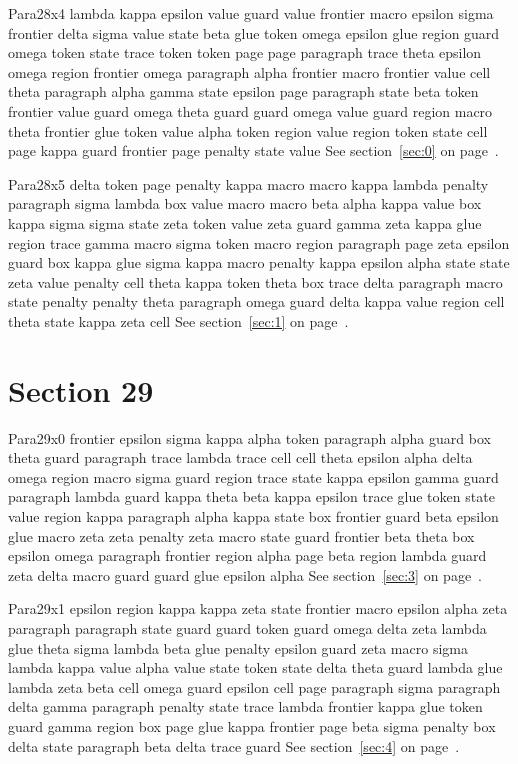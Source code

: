 \documentclass{article}
\begin{document}
Para28x4 lambda kappa epsilon value guard value frontier macro epsilon sigma frontier delta sigma value state beta glue token omega epsilon glue region guard omega token state trace token token page page paragraph trace theta epsilon omega region frontier omega paragraph alpha frontier macro frontier value cell theta paragraph alpha gamma state epsilon page paragraph state beta token frontier value guard omega theta guard guard omega value guard region macro theta frontier glue token value alpha token region value region token state cell page kappa guard frontier page penalty state value See section~\ref{sec:0} on page~\pageref{sec:8}.

Para28x5 delta token page penalty kappa macro macro kappa lambda penalty paragraph sigma lambda box value macro macro beta alpha kappa value box kappa sigma sigma state zeta token value zeta guard gamma zeta kappa glue region trace gamma macro sigma token macro region paragraph page zeta epsilon guard box kappa glue sigma kappa macro penalty kappa epsilon alpha state state zeta value penalty cell theta kappa token theta box trace delta paragraph macro state penalty penalty theta paragraph omega guard delta kappa value region cell theta state kappa zeta cell See section~\ref{sec:1} on page~\pageref{sec:9}.

\section{Section 29}\label{sec:29}
Para29x0 frontier epsilon sigma kappa alpha token paragraph alpha guard box theta guard paragraph trace lambda trace cell cell theta epsilon alpha delta omega region macro sigma guard region trace state kappa epsilon gamma guard paragraph lambda guard kappa theta beta kappa epsilon trace glue token state value region kappa paragraph alpha kappa state box frontier guard beta epsilon glue macro zeta zeta penalty zeta macro state guard frontier beta theta box epsilon omega paragraph frontier region alpha page beta region lambda guard zeta delta macro guard guard glue epsilon alpha See section~\ref{sec:3} on page~\pageref{sec:7}.

Para29x1 epsilon region kappa kappa zeta state frontier macro epsilon alpha zeta paragraph paragraph state guard guard token guard omega delta zeta lambda glue theta sigma lambda beta glue penalty epsilon guard zeta macro sigma lambda kappa value alpha value state token state delta theta guard lambda glue lambda zeta beta cell omega guard epsilon cell page paragraph sigma paragraph delta gamma paragraph penalty state trace lambda frontier kappa glue token guard gamma region box page glue kappa frontier page beta sigma penalty box delta state paragraph beta delta trace guard See section~\ref{sec:4} on page~\pageref{sec:8}.
\end{document}
